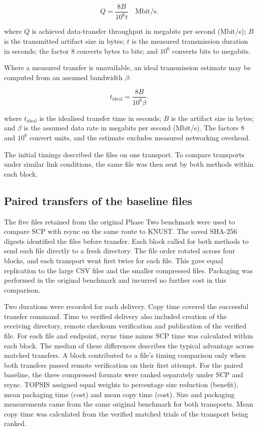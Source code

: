 \[
Q=\frac{8B}{10^6t}\quad\text{Mbit/s}.\tag{3.5.3}
\]

\noindent where \(Q\) is achieved data-transfer throughput in megabits per second
(Mbit/s); \(B\) is the transmitted artifact size in bytes; \(t\) is the
measured transmission duration in seconds; the factor \(8\) converts
bytes to bits; and \(10^6\) converts bits to megabits.

\noindent Where a measured transfer is unavailable, an ideal transmission estimate
may be computed from an assumed bandwidth \(\beta\):

\[
t_{\mathrm{ideal}}=\frac{8B}{10^6\beta}.\tag{3.5.4}
\]

\noindent where \(t_{\mathrm{ideal}}\) is the idealised transfer time in seconds;
\(B\) is the artifact size in bytes; and \(\beta\) is the assumed data
rate in megabits per second (Mbit/s). The factors \(8\) and \(10^6\)
convert units, and the estimate excludes measured networking overhead.

\noindent The initial timings described the files on one transport. To compare transports under similar link conditions, the same file was then sent by both methods within each block.

\subsection{Paired transfers of the baseline files}
\noindent The five files retained from the original Phase Two benchmark were used to compare SCP with rsync on the same route to KNUST. The saved SHA-256 digests identified the files before transfer. Each block called for both methods to send each file directly to a fresh directory. The file order rotated across four blocks, and each transport went first twice for each file. This gave equal replication to the large CSV files and the smaller compressed files. Packaging was performed in the original benchmark and incurred no further cost in this comparison.

\noindent Two durations were recorded for each delivery. Copy time covered the successful transfer command. Time to verified delivery also included creation of the receiving directory, remote checksum verification and publication of the verified file. For each file and endpoint, rsync time minus SCP time was calculated within each block. The median of these differences describes the typical advantage across matched transfers. A block contributed to a file's timing comparison only when both transfers passed remote verification on their first attempt. For the paired baseline, the three compressed formats were ranked separately under SCP and rsync. TOPSIS assigned equal weights to percentage size reduction (benefit), mean packaging time (cost) and mean copy time (cost). Size and packaging measurements came from the same original benchmark for both transports. Mean copy time was calculated from the verified matched trials of the transport being ranked.

